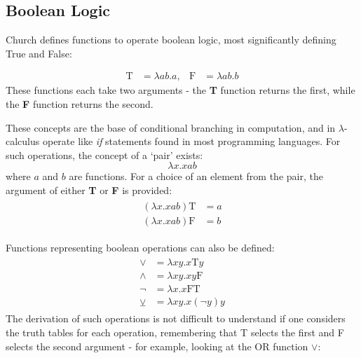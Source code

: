 \documentclass[Master.tex]{subfiles}
\begin{document}
\subsection{Boolean Logic}

Church defines functions to operate boolean logic, most significantly defining True and False:
\cite{rojas2015lambdatutorial}
    
\begin{equation*}
\begin{aligned}
\bm{\mathrm{T}} &= \lambda ab.a,
  & %
\bm{\mathrm{F}} &= \lambda ab.b
\end{aligned}
\end{equation*}
These functions each take two arguments - the \textbf{T} function returns the first, while the \textbf{F} function returns the second.

These concepts are the base of conditional branching in computation, and in $\lambda$-calculus operate like \textit{if} statements found in most programming languages. For such operations, the concept of a `pair' exists:
\cite{church1941lambda}
\begin{equation*}
\lambda x.xab
\end{equation*}
where $a$ and $b$ are functions. For a choice of an element from the pair, the argument of either \textbf{T} or \textbf{F} is provided:
\begin{gather*}
\begin{aligned}
(\lambda x.xab)\bm{\mathrm{T}} &= a\\
(\lambda x.xab)\bm{\mathrm{F}} &= b
\end{aligned}
\end{gather*}

Functions representing boolean operations can also be defined:
\cite{rojas2015lambdatutorial}
\begin{gather*}
\begin{aligned}
\vee &= \lambda xy.x\bm{\mathrm{T}}y\\
\wedge &= \lambda xy.xy\bm{\mathrm{F}}\\
\lnot &= \lambda x.x\bm{\mathrm{FT}} \\
\veebar &= \lambda xy.x(\lnot y)y
\end{aligned}
\end{gather*}
The derivation of such operations is not difficult to understand if one considers the truth tables for each operation, remembering that T selects the first and F selects the second argument - for example, looking at the OR function $\vee$:
\end{document}
